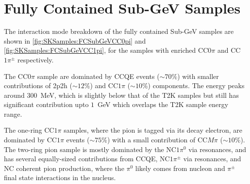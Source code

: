 \section{Fully Contained Sub-GeV Samples}
The interaction mode breakdown of the fully contained Sub-GeV samples are shown in \autoref{fig:SKSamples:FCSubGeVCC0pi} and \autoref{fig:SKSamples:FCSubGeVCC1pi}, for the samples with enriched CC$0\pi$ and CC$1\pi^\pm$ respectively.

The CC$0\pi$ sample are dominated by CCQE events ($\sim 70\%$) with smaller contributions of 2p2h ($\sim 12\%$) and CC$1\pi$ ($\sim 10\%$) components. The energy peaks around $300$~MeV, which is slightly below that of the T2K samples but still has significant contribution upto $1$~GeV which overlaps the T2K sample energy range.

The one-ring CC$1\pi$ samples, where the pion is tagged via its decay electron, are dominated by CC$1\pi$ events ($\sim 75\%$) with a small contribution of CC$M\pi$ ($\sim 10\%$). The two-ring pion sample is mostly dominated by the NC$1\pi^0$ via resonances, and has several equally-sized contributions from CCQE, NC$1\pi^\pm$ via resonances, and NC coherent pion production, where the $\pi^0$ likely comes from nucleon and $\pi^\pm$ final state interactions in the nucleus.

